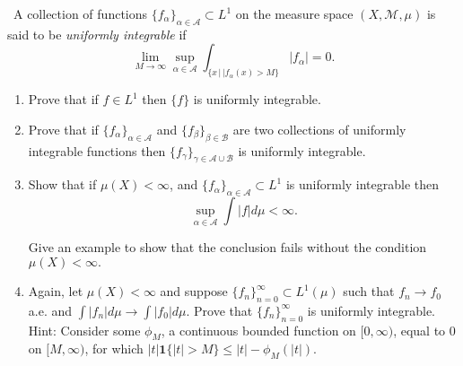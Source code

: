 \documentclass[12pt]{Qual}
\begin{document}
\begin{problem} $\,$
A collection of functions $\{f_\alpha\}_{\alpha\in\mathscr{A}}\subset L^1$ on the measure space $(X,\mathscr{M},\mu)$ is said to be \textit{uniformly integrable} if $$\lim_{M\to\infty}\sup_{\alpha\in\mathscr{A}}\int_{\{x\,|\,|f_\alpha(x)>M\}}|f_\alpha|=0.$$
\begin{enumerate}[label=(\alph*)]
    \item Prove that if $f\in L^1$ then $\{f\}$ is uniformly integrable.
    \item Prove that if $\{f_\alpha\}_{\alpha\in\mathscr{A}}$ and $\{f_\beta\}_{\beta\in\mathscr{B}}$ are two collections of uniformly integrable functions then $\{f_\gamma\}_{\gamma\in\mathscr{A}\cup\mathscr{B}}$ is uniformly integrable.
    \item Show that if $\mu(X)<\infty$, and $\{f_\alpha\}_{\alpha\in\mathscr{A}}\subset L^1$ is uniformly integrable then $$\sup_{\alpha\in\mathscr{A}}\int|f|d\mu<\infty.$$

    Give an example to show that the conclusion fails without the condition $\mu(X)<\infty.$
    \item Again, let $\mu(X)<\infty$ and suppose $\{f_n\}_{n=0}^\infty\subset L^1(\mu)$ such that $f_n\to f_0$ a.e. and $\int|f_n|d\mu\to\int|f_0|d\mu$. Prove that $\{f_n\}_{n=0}^\infty$ is uniformly integrable. Hint: Consider some $\phi_M$, a continuous bounded function on $[0,\infty)$, equal to $0$ on $[M,\infty)$, for which $|t|\mathbf{1}\{|t|>M\}\le|t|-\phi_M(|t|).$
\end{enumerate}
\end{problem}
\end{document}
